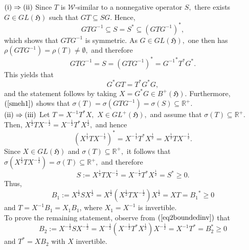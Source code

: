 \documentclass{amsart}
\makeatletter
\newcommand{\vide}{\emptyset}
\newcommand{\h}{\mathfrak{H}}
\newcommand{\adj}{^*}
\newcommand{\inv}{^{-1}}
\newcommand{\tstar}{T^{*}}
\newcommand{\half}{^{\frac{1}{2}}}
\newcommand{\mhalf}{^{-\frac{1}{2}}}
\newcommand{\rplus}{\mathbb{R^+}}
\newcommand{\inclu}{\subseteq}
\newcommand{\lplus}{B^{+}(\h)}
\newcommand{\gplus}{GL^{+}(\h)}
\numberwithin{equation}{section}
\renewenvironment{proof}[1][\proofname]{%
   \par\pushQED{\qed}\normalfont%
   \topsep6\p@\@plus6\p@\relax
   \trivlist\item[\hskip\labelsep\bfseries#1\@addpunct{.}]%
   \ignorespaces
}{%
   \popQED\endtrivlist\@endpefalse
}
\makeatother
\begin{document}
\begin{proof}
      $\rm (i) \Rightarrow (ii)$
       Since $T$ is $\mathcal{W}$-similar to a nonnegative operator $S,$ there exists $G \in GL(\h)$ such that $GT\inclu SG.$ Hence,
       $$
       GT G\inv \inclu S = S\adj   \inclu (GT G\inv)\adj,
       $$
     which shows that $GT G\inv$ is symmetric. As $G\in GL(\h),$ one then has  $\rho(GT G\inv)=\rho(T) \neq \vide,$  and therefore
      \begin{equation}\label{smeh1}
       GT G\inv = S = (GT G\inv)\adj= {G\inv}\adj \tstar G\adj.
       \end{equation}
   This yields that
      $$
     G\adj G T  =  \tstar G\adj G,
      $$
   and the statement follows by taking $X=G\adj G \in \lplus.$ Furthermore, $(\ref{smeh1})$ shows that $\sigma(T)= \sigma(GT G\inv)= \sigma(S) \inclu \rplus.$ \\
        \hspace*{0.3cm}
       $\rm (ii) \Rightarrow (iii)$
        Let $T = X\inv  \tstar X, $ $ X \in \gplus,$ and assume that $\sigma(T) \inclu \rplus.$  Then,
        $
        X\half T X\mhalf =  X\mhalf \tstar X\half,
        $
        and hence
         $$
        ( X\half T X\mhalf)\adj=  X\mhalf \tstar X\half= X\half T X\mhalf.
        $$
Since $X  \in GL(\h)$ and $ \sigma(T) \inclu \rplus,$ it follows that
$
\sigma(X\half T X\mhalf)=\sigma(T) \inclu \rplus,
$
and therefore
\begin{equation}\label{eq2boundedinv}
S:=X\half T X\mhalf = X\mhalf \tstar X\half  =S\adj \geq 0.
\end{equation}
 Thus,
 $$
   B_1:=  X\half S  X\half= X\half  (X\half T X\mhalf ) X\half= X T = {B_1}\adj \geq 0
    $$
    and  $T =  X\inv  B_1 =X_1 B_1$, where $X_1=X\inv $ is invertible.   \\
 \hspace*{0.4cm}  To prove the remaining statement, observe from $(\ref{eq2boundedinv})$ that
   $$
B_2:=  X\mhalf S  X\mhalf= X\mhalf ( X\mhalf \tstar X\half) X\mhalf =X\inv \tstar= B_2\adj  \geq 0$$
and    $\tstar=XB_2$ with $X$ invertible. \\

\end{proof}
\end{document}
